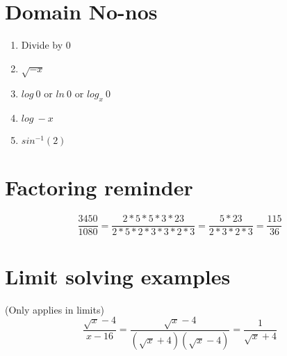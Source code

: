 \documentclass[12pt, english]{article}
\begin{document}
\section{Domain No-nos}
\begin{enumerate}
	\item Divide by 0
	\item $\sqrt{-x}$
	\item $log\ 0$ or $ln\ 0$ or $log_x\ 0$
	\item $log\ -x$
	\item $sin^{-1}(2)$
\end{enumerate}

\section{Factoring reminder}
\begin{equation}
	\frac{3450}{1080} = \frac{2*5*5*3*23}{2*5*2*3*3*2*3} = \frac{5*23}{2*3*2*3} = \frac{115}{36}
\end{equation}

\section{Limit solving examples}
(Only applies in limits)
\begin{equation}
	\frac{\sqrt{x}-4}{x-16} = \frac{\sqrt{x}-4}{(\sqrt{x}+4)(\sqrt{x}-4)} = \frac{1}{\sqrt{x}+4}
\end{equation}
\end{document}
